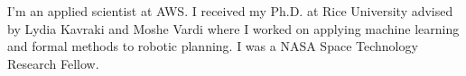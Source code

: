 
\small{I'm an applied scientist at AWS. I received my Ph.D. at Rice University advised by Lydia Kavraki and Moshe Vardi where I worked on applying machine learning and formal methods to robotic planning. I was a NASA Space Technology Research Fellow.}
